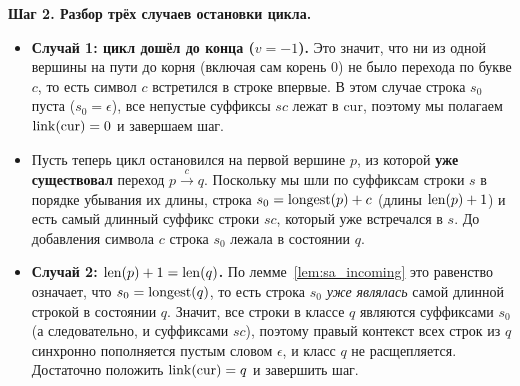 \textbf{Шаг 2. Разбор трёх случаев остановки цикла.}
\begin{itemize}
    \item \textbf{Случай 1: цикл дошёл до конца ($v = -1$).} Это значит, что ни из одной вершины на пути до корня (включая сам корень $0$) не было перехода по букве $c$, то есть символ $c$ встретился в строке впервые. В этом случае строка $s_0$ пуста ($s_0 = \epsilon$), все непустые суффиксы $sc$ лежат в $\text{cur}$, поэтому мы полагаем $\operatorname{link}(\text{cur}) = 0$ и завершаем шаг.

    \item Пусть теперь цикл остановился на первой вершине $p$, из которой \textbf{уже существовал} переход $p \xrightarrow{c} q$. Поскольку мы шли по суффиксам строки $s$ в порядке убывания их длины, строка $s_0 = \operatorname{longest}(p) + c$ (длины $\operatorname{len}(p) + 1$) и есть самый длинный суффикс строки $sc$, который уже встречался в $s$. До добавления символа $c$ строка $s_0$ лежала в состоянии $q$.

    \item \textbf{Случай 2: $\operatorname{len}(p) + 1 = \operatorname{len}(q)$.} По лемме~\ref{lem:sa_incoming} это равенство означает, что $s_0 = \operatorname{longest}(q)$, то есть строка $s_0$ \emph{уже являлась} самой длинной строкой в состоянии $q$. Значит, все строки в классе $q$ являются суффиксами $s_0$ (а следовательно, и суффиксами $sc$), поэтому правый контекст всех строк из $q$ синхронно пополняется пустым словом $\epsilon$, и класс $q$ не расщепляется. Достаточно положить $\operatorname{link}(\text{cur}) = q$ и завершить шаг.


\end{itemize}
